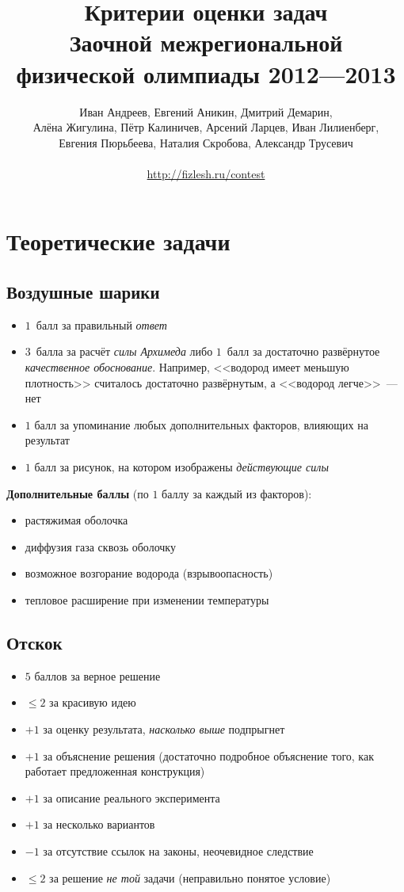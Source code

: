 \documentclass[10pt, a4paper, oneside, fleqn]{article}
\title{Критерии оценки задач\\
Заочной межрегиональной\\
физической олимпиады 2012---2013}
\author{\small{
Иван Андреев,
Евгений Аникин,
Дмитрий Демарин,}\\
\small{
Алёна Жигулина,
Пётр Калиничев,
Арсений Ларцев,
Иван Лилиенберг,}\\
\small{
Евгения Пюрьбеева,
Наталия Скробова,
Александр Трусевич}\\
\\
\url{http://fizlesh.ru/contest}}
\newcommand\т{~--- }
\def\le{\leqslant}
\newenvironment{items}
{\begin{itemize}%
\setlength{\itemsep}{-1pt}}
{\end{itemize}}
\begin{document}

\maketitle

\section{Теоретические задачи}

\subsection{Воздушные шарики}

\begin{items}
\item $1$~балл за правильный \emph{ответ}
\item $3$~балла за расчёт \emph{силы Архимеда} либо $1$~балл за достаточно развёрнутое \emph{качественное обоснование}.
Например, <<водород имеет меньшую плотность>> считалось достаточно развёрнутым, а <<водород легче>>\т нет
\item $1$ балл за упоминание любых дополнительных факторов, влияющих на результат
\item $1$ балл за рисунок, на котором изображены \emph{действующие силы}
\end{items}

\textbf{Дополнительные баллы} (по $1$ баллу за каждый из факторов):
\begin{items}
\item растяжимая оболочка
\item диффузия газа сквозь оболочку
\item возможное возгорание водорода (взрывоопасность)
\item тепловое расширение при изменении температуры
\end{items}

\subsection{Отскок}

\begin{items}
\item $5$ баллов за верное решение
\item $\le 2$ за красивую идею
\item $+1$ за оценку результата, \emph{насколько выше} подпрыгнет
\item $+1$ за объяснение решения (достаточно подробное объяснение того, как работает предложенная конструкция)
\item $+1$ за описание реального эксперимента
\item $+1$ за несколько вариантов
\item $-1$ за отсутствие ссылок на законы, неочевидное следствие
\item $\le 2$ за решение \emph{не той} задачи (неправильно понятое условие)
\end{items}
\end{document}

